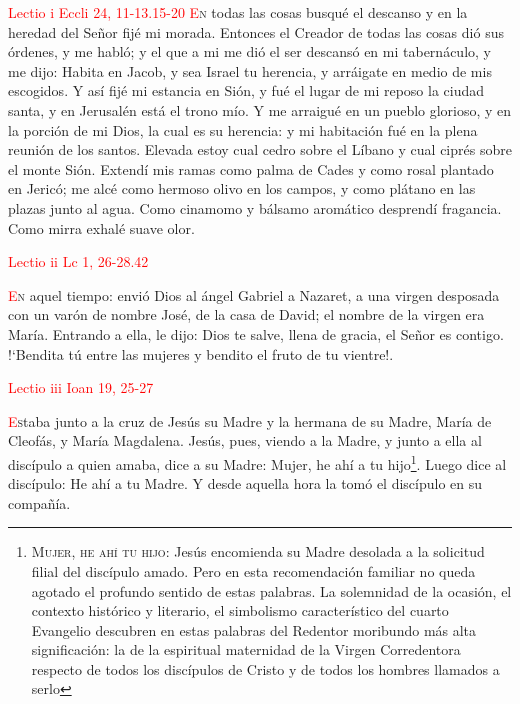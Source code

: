 \noindent\textcolor{red}{Lectio i \hfill Eccli 24, 11-13.15-20}
\lettrine[lines=2]{\textcolor{red}{E}}n todas las cosas busqué el descanso y en la heredad del Señor fijé mi morada. Entonces el Creador de todas las cosas dió sus órdenes, y me habló; y el que a mi me dió el ser
descansó en mi tabernáculo, y me dijo: Habita en Jacob, y sea Israel tu herencia, y arráigate en medio de mis escogidos. Y así fijé mi estancia en Sión, y fué el lugar de mi reposo
la ciudad santa, y en Jerusalén está el trono mío. Y me arraigué en un pueblo glorioso, y en la porción de mi Dios, la cual es su herencia: y mi habitación fué en la plena reunión
de los santos. Elevada estoy cual cedro sobre el Líbano y cual ciprés sobre el monte Sión. Extendí mis ramas como palma de Cades y como rosal plantado en Jericó; me alcé como hermoso
olivo en los campos, y como plátano en las plazas junto al agua. Como cinamomo y bálsamo aromático desprendí fragancia. Como mirra exhalé suave olor.

\vspace{0.5em}

\noindent\textcolor{red}{Lectio ii \hfill Lc 1, 26-28.42}

\lettrine[lines=2]{\textcolor{red}{E}}n aquel tiempo: envió Dios al ángel Gabriel a Nazaret, a una virgen desposada con un varón de nombre José, de la casa de David; el nombre de la virgen era María. 
Entrando a ella, le dijo: Dios te salve, llena de gracia, el Señor es contigo. {!`}Bendita tú entre las mujeres y bendito el fruto de tu vientre!.

\vspace{0.5em}

\noindent\textcolor{red}{Lectio iii \hfill Ioan 19, 25-27}

\lettrine[lines=2]{\textcolor{red}{E}}staba junto a la cruz de Jesús su Madre y la hermana de su Madre, María de Cleofás, y María Magdalena. Jesús, pues, viendo a la Madre, y junto a ella
al discípulo a quien amaba, dice a su Madre: Mujer, he ahí a tu hijo\footnote{\textsc{Mujer, he ahí tu hijo}: Jesús encomienda su Madre desolada a la solicitud filial del discípulo amado. 
Pero en esta recomendación familiar no queda agotado el profundo sentido de estas palabras. La solemnidad de la ocasión, el contexto histórico y literario, el simbolismo característico 
del cuarto Evangelio descubren en estas palabras del Redentor moribundo más alta significación: la de la espiritual maternidad de la Virgen Corredentora respecto de todos los discípulos 
de Cristo y de todos los hombres llamados a serlo\cite{maria-pies-cruz}}. Luego dice al discípulo: He ahí a tu Madre. Y desde aquella hora la tomó el discípulo en su compañía.

